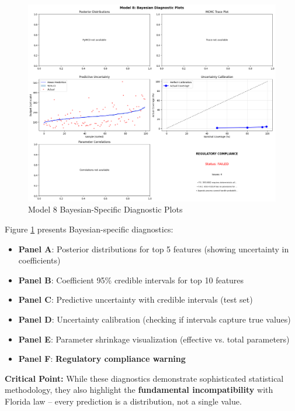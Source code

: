 \begin{figure}[h!]
\centering
\includegraphics[width=\textwidth]{models/model_8/bayesian_diagnostic_plots.png}
\caption{Model 8 Bayesian-Specific Diagnostic Plots}
\label{fig:model8_bayesian}
\end{figure}

Figure \ref{fig:model8_bayesian} presents Bayesian-specific diagnostics:
\begin{itemize}
    \item \textbf{Panel A}: Posterior distributions for top 5 features (showing uncertainty in coefficients)
    \item \textbf{Panel B}: Coefficient 95\% credible intervals for top 10 features
    \item \textbf{Panel C}: Predictive uncertainty with credible intervals (test set)
    \item \textbf{Panel D}: Uncertainty calibration (checking if intervals capture true values)
    \item \textbf{Panel E}: Parameter shrinkage visualization (effective vs. total parameters)
    \item \textbf{Panel F}: \textbf{Regulatory compliance warning}
\end{itemize}

\textbf{Critical Point:} While these diagnostics demonstrate sophisticated statistical methodology, they also highlight the \textbf{fundamental incompatibility} with Florida law -- every prediction is a distribution, not a single value.


